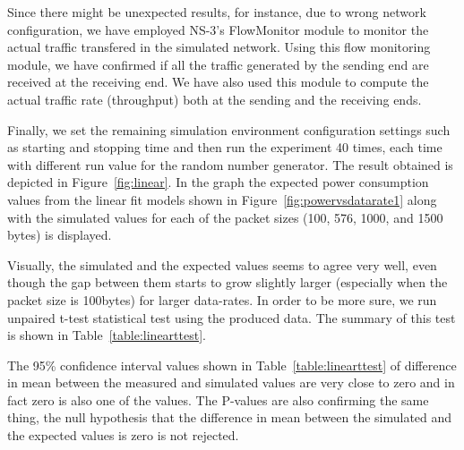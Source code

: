 Since there might be unexpected results, for instance, due to wrong network configuration, we have employed NS-3's FlowMonitor module to monitor the actual traffic transfered in the simulated network. Using this flow monitoring module, we have confirmed if all the traffic generated by the sending end are received at the receiving end. We have also used this module to compute the actual traffic rate (throughput) both at the sending and the receiving ends.

Finally, we set the remaining simulation environment configuration settings such as starting and stopping time and then run the experiment 40 times, each time with different run value for the random number generator. The result obtained is depicted in Figure~\ref{fig:linear}. In the graph the expected power consumption values from the linear fit models shown in Figure~\ref{fig:powervsdatarate1} along with the simulated values for each of the packet sizes (100, 576, 1000, and 1500 bytes) is displayed.

Visually, the simulated and the expected values seems to agree very well, even though the gap between them starts to grow slightly larger (especially when the packet size is 100bytes) for larger data-rates. In order to be more sure, we run unpaired t-test statistical test using the produced data. The summary of this test is shown in Table~\ref{table:linearttest}. 

The 95\% confidence interval values shown in Table~\ref{table:linearttest} of difference in mean between the measured and simulated values are very close to zero and in fact zero is also one of the values. The P-values are also confirming the same thing, the null hypothesis that the difference in mean between the simulated and the expected values is zero is not rejected. 

